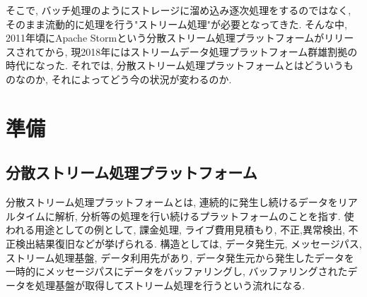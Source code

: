 \documentclass[11pt]{jreport}
\begin{document}
そこで, バッチ処理のようにストレージに溜め込み逐次処理をするのではなく, そのまま流動的に処理を行う"ストリーム処理"が必要となってきた. そんな中, 2011年頃にApache Stormという分散ストリーム処理プラットフォームがリリースされてから, 現2018年にはストリームデータ処理プラットフォーム群雄割拠の時代になった. それでは, 分散ストリーム処理プラットフォームとはどういうものなのか, それによってどう今の状況が変わるのか. 



\chapter{準備}
\section{分散ストリーム処理プラットフォーム}
分散ストリーム処理プラットフォームとは, 連続的に発生し続けるデータをリアルタイムに解析, 分析等の処理を行い続けるプラットフォームのことを指す.  
使われる用途としての例として, 課金処理, ライブ費用見積もり, 不正,異常検出, 不正検出結果復旧などが挙げられる. 
構造としては, データ発生元, メッセージパス, ストリーム処理基盤, データ利用先があり, データ発生元から発生したデータを一時的にメッセージパスにデータをバッファリングし, バッファリングされたデータを処理基盤が取得してストリーム処理を行うという流れになる. 
\end{document}
